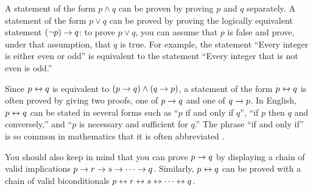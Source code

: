 A statement of the form $p\land q$ can be proven by proving
$p$ and $q$ separately.  A statement of the form $p\lor q$
can be proved by proving the logically equivalent statement
$(\lnot p)\rightarrow q$: to prove
$p\lor q$, you can assume that $p$ is false and prove, under
that assumption, that $q$ is true.  For example, the
statement ``Every integer is either even or odd'' is
equivalent to the statement ``Every integer that is not even
is odd.''

Since $p\leftrightarrow q$ is equivalent
to $(p\rightarrow q)\land (q\rightarrow p)$, a statement of the form $p\leftrightarrow q$
is often proved by giving two proofs, one of
$p\rightarrow q$ and one of $q\rightarrow p$.  In English,
$p\leftrightarrow q$ can be stated in several forms such as
``$p$ if and only if $q$'', ``if $p$ then $q$ and conversely,''
and ``$p$ is necessary and sufficient for $q$.''  The phrase
``if and only if'' is so common in mathematics that it is
often abbreviated .

You should also keep in mind that you can prove $p\rightarrow q$
by displaying a chain of valid implications $p\rightarrow r\rightarrow s\rightarrow \cdots\rightarrow q$.
Similarly, $p\leftrightarrow q$ can be proved with a chain of valid
biconditionals $p\leftrightarrow r\leftrightarrow s\leftrightarrow \cdots\leftrightarrow q$.

\medbreak

